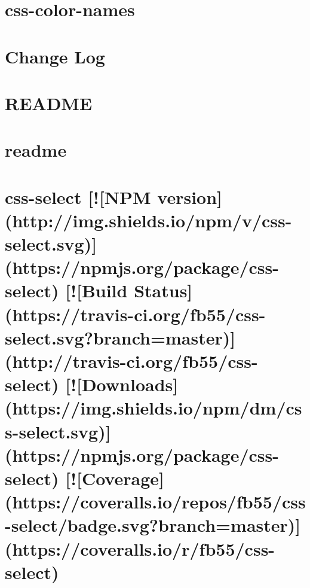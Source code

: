 \documentclass[twoside]{book}
\newcommand{\+}{\discretionary{\mbox{\scriptsize$\hookleftarrow$}}{}{}}
\begin{document}
\chapter{css-\/color-\/names}
\label{md__c_1_workspace_demo_src_main_script_node_modules_css-color-names__r_e_a_d_m_e}

\chapter{Change Log}
\label{md__c_1_workspace_demo_src_main_script_node_modules_css-loader__c_h_a_n_g_e_l_o_g}

\chapter{R\+E\+A\+D\+ME}
\label{md__c_1_workspace_demo_src_main_script_node_modules_css-loader__r_e_a_d_m_e}

\chapter{readme}
\label{md__c_1_workspace_demo_src_main_script_node_modules_css-select_node_modules_domutils_readme}

\chapter{css-\/select \mbox{[}!\mbox{[}N\+PM version\mbox{]}(http\+://img.shields.\+io/npm/v/css-\/select.svg)\mbox{]}(https\+://npmjs.org/package/css-\/select) \mbox{[}!\mbox{[}Build Status\mbox{]}(https\+://travis-\/ci.org/fb55/css-\/select.svg?branch=master)\mbox{]}(http\+://travis-\/ci.org/fb55/css-\/select) \mbox{[}!\mbox{[}Downloads\mbox{]}(https\+://img.shields.\+io/npm/dm/css-\/select.svg)\mbox{]}(https\+://npmjs.org/package/css-\/select) \mbox{[}!\mbox{[}Coverage\mbox{]}(https\+://coveralls.io/repos/fb55/css-\/select/badge.svg?branch=master)\mbox{]}(https\+://coveralls.io/r/fb55/css-\/select)}
\label{md__c_1_workspace_demo_src_main_script_node_modules_css-select__r_e_a_d_m_e}

\end{document}
